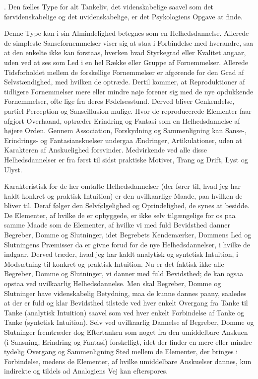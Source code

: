 \documentclass[12pt]{article}
\newcommand{\opage}[1]{\marginnote{\footnotesize\textit{[#1]}}}
\begin{document}
. Den fælles Type for alt Tankeliv, det videnskabelige saavel som det
førvidenskabelige og det uvidenskabelige, er det Psykologiens Opgave at finde.

Denne Type kan i sin Almindelighed betegnes som en Helhedsdannelse. Allerede de
simpleste Sansefornemmelser viser sig at staa i Forbindelse med hverandre, saa
at den enkelte ikke kan forstaas, hverken hvad Styrkegrad eller Kvalitet angaar,
uden ved at ses som Led i en hel Række eller Gruppe af Fornemmelser. Allerede
Tidsforholdet mellem de forskellige Fornemmelser er afgørende for den Grad af
Selvstændighed, med hvilken de optræde. Dertil kommer, at Reproduktioner af
tidligere Fornemmelser mere eller mindre nøje forener sig med de nye opdukkende
Fornemmelser, ofte lige fra deres Fødelsesstund. Derved bliver Genkendelse,
partiel Perception og Sanseillusion mulige. Hvor de reproducerede Elementer
faar afgjort Overhaand, optræder Erindring og Fantasi som en Helhedsdannelse af
højere Orden. Gennem Association, Forskydning og Sammenligning kan Sanse-,
Erindrings- og Fantasianskuelser undergaa Ændringer, Artikulationer, uden at
Karakteren af Anskuelighed forsvinder. Medvirkende ved alle disse
Helhedsdannelser er fra først til sidst praktiske Motiver, Trang og Drift, Lyst
og Ulyst.

Karakteristisk for de her omtalte Helhedsdannelser (der fører til, hvad jeg har
kaldt konkret og praktisk Intuition) er den uvilkaarlige Maade, paa hvilken de
bliver til. Deraf følger den Selvfølgelighed og Oprindelighed, de synes at
besidde. De Elementer, af hvilke de er opbyggede, er ikke selv tilgængelige for
os paa samme Maade som de Elementer, af hvilke vi med fuld Bevidsthed danner
Begreber, Domme og Slutninger, idet Begrebets Kendemærker, Dommens Led og
Slutningens Præmisser da er givne forud for de nye Helhedsdannelser, i hvilke
de indgaar. Derved træder, hvad jeg har kaldt analytisk og syntetisk Intuition,
i Modsætning til konkret og praktisk Intuition. Nu er det faktisk ikke alle
Begreber, Domme og Slutninger, vi danner med fuld Bevidsthed; de kan ogsaa
opstaa ved uvilkaarlig Helhedsdannelse. Men skal Begreber, Domme og Slutninger
have videnskabelig Betydning, maa de kunne dannes paany, saaledes at der er
fuld og klar Bevidsthed tilstede
\setcounter{footnote}{0}%
\opage{7}ved hver enkelt Overgang fra Tanke til Tanke (analytisk Intuition)
saavel som ved hver enkelt Forbindelse af Tanke og Tanke (syntetisk Intuition).
Selv ved uvilkaarlig Dannelse af Begreber, Domme og Slutninger fremtræder dog
Eftertanken som noget fra den umiddelbare Anskuen (i Sansning, Erindring og
Fantasi) forskelligt, idet der finder en mere eller mindre tydelig Overgang og
Sammenligning Sted mellem de Elementer, der bringes i Forbindelse, medens de
Elementer, af hvilke umiddelbare Anskuelser dannes, kun indirekte og tildels ad
Analogiens Vej kan efterspores.
\end{document}
